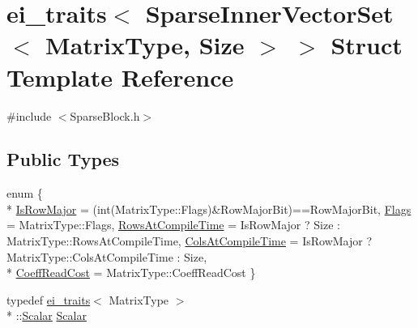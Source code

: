 \hypertarget{structei__traits_3_01_sparse_inner_vector_set_3_01_matrix_type_00_01_size_01_4_01_4}{\section{ei\-\_\-traits$<$ Sparse\-Inner\-Vector\-Set$<$ Matrix\-Type, Size $>$ $>$ Struct Template Reference}
\label{structei__traits_3_01_sparse_inner_vector_set_3_01_matrix_type_00_01_size_01_4_01_4}
}


{\ttfamily \#include $<$Sparse\-Block.\-h$>$}

\subsection*{Public Types}
\begin{DoxyCompactItemize}
\item 
enum \{ \\*
\hyperlink{structei__traits_3_01_sparse_inner_vector_set_3_01_matrix_type_00_01_size_01_4_01_4_a0b789bb737be05272166064a0f8c89e2a5d52fba1da31e4a247345df9c19ec4c8}{Is\-Row\-Major} = (int(Matrix\-Type\-:\-:Flags)\&Row\-Major\-Bit)==Row\-Major\-Bit, 
\hyperlink{structei__traits_3_01_sparse_inner_vector_set_3_01_matrix_type_00_01_size_01_4_01_4_a0b789bb737be05272166064a0f8c89e2a26041d7adda6f5cee0dea749f2ecb8d7}{Flags} = Matrix\-Type\-:\-:Flags, 
\hyperlink{structei__traits_3_01_sparse_inner_vector_set_3_01_matrix_type_00_01_size_01_4_01_4_a0b789bb737be05272166064a0f8c89e2a0518be726f497e85d056024ad250a17d}{Rows\-At\-Compile\-Time} = Is\-Row\-Major ? Size \-: Matrix\-Type\-:\-:Rows\-At\-Compile\-Time, 
\hyperlink{structei__traits_3_01_sparse_inner_vector_set_3_01_matrix_type_00_01_size_01_4_01_4_a0b789bb737be05272166064a0f8c89e2a11b604d68185d2aa5c5a1ddb7e48967a}{Cols\-At\-Compile\-Time} = Is\-Row\-Major ? Matrix\-Type\-:\-:Cols\-At\-Compile\-Time \-: Size, 
\\*
\hyperlink{structei__traits_3_01_sparse_inner_vector_set_3_01_matrix_type_00_01_size_01_4_01_4_a0b789bb737be05272166064a0f8c89e2a29552f4cd70fe174b84b44b78fa03213}{Coeff\-Read\-Cost} = Matrix\-Type\-:\-:Coeff\-Read\-Cost
 \}
\item 
typedef \hyperlink{structei__traits}{ei\-\_\-traits}$<$ Matrix\-Type $>$\\*
\-::\hyperlink{structei__traits_3_01_sparse_inner_vector_set_3_01_matrix_type_00_01_size_01_4_01_4_a4a2fad2e3edfc87203c9101c0d95dabd}{Scalar} \hyperlink{structei__traits_3_01_sparse_inner_vector_set_3_01_matrix_type_00_01_size_01_4_01_4_a4a2fad2e3edfc87203c9101c0d95dabd}{Scalar}
\end{DoxyCompactItemize}


